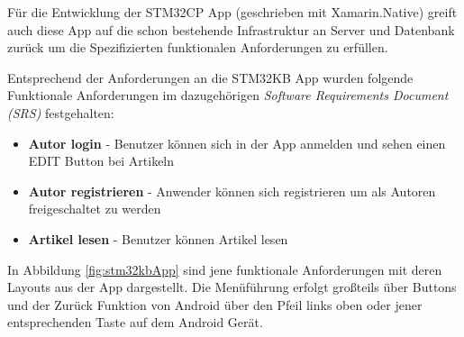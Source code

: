 	Für die Entwicklung der STM32CP App (geschrieben mit Xamarin.Native) greift auch diese App auf die schon bestehende Infrastruktur an Server und Datenbank zurück um die Spezifizierten funktionalen Anforderungen zu erfüllen.

	\newpage
	Entsprechend der Anforderungen an die STM32KB App wurden folgende Funktionale Anforderungen im dazugehörigen \textit{Software Requirements Document (SRS)} festgehalten:
	\begin{itemize}
		\setlength\itemsep{0em}
		\item \textbf{Autor login} - Benutzer können sich in der App anmelden und sehen einen EDIT Button bei Artikeln
		\item \textbf{Autor registrieren} - Anwender können sich registrieren um als Autoren freigeschaltet zu werden
		\item \textbf{Artikel lesen} - Benutzer können Artikel lesen
	\end{itemize}

	In Abbildung \ref{fig:stm32kbApp} sind jene funktionale Anforderungen mit deren Layouts aus der App dargestellt. Die Menüführung erfolgt großteils über Buttons und der Zurück Funktion von Android über den Pfeil links oben oder jener entsprechenden Taste auf dem Android Gerät.

